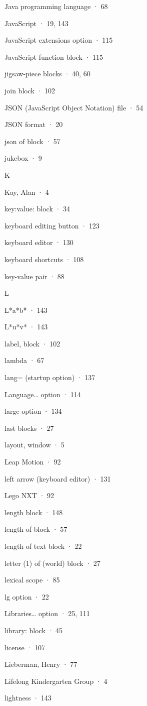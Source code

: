 \documentclass[
  letterpaper,
]{book}
\begin{document}
Java programming language · 68

JavaScript · 19, 143

JavaScript extensions option · 115

JavaScript function block · 115

jigsaw-piece blocks · 40, 60

join block · 102

JSON (JavaScript Object Notation) file · 54

JSON format · 20

json of block · 57

jukebox · 9

K

Kay, Alan · 4

key:value: block · 34

keyboard editing button · 123

keyboard editor · 130

keyboard shortcuts · 108

key-value pair · 88

L

L*a*b* · 143

L*u*v* · 143

label, block · 102

lambda · 67

lang= (startup option) · 137

Language\ldots{} option · 114

large option · 134

last blocks · 27

layout, window · 5

Leap Motion · 92

left arrow (keyboard editor) · 131

Lego NXT · 92

length block · 148

length of block · 57

length of text block · 22

letter (1) of (world) block · 27

lexical scope · 85

lg option · 22

Libraries\ldots{} option · 25, 111

library: block · 45

license · 107

Lieberman, Henry · 77

Lifelong Kindergarten Group · 4

lightness · 143
\end{document}

